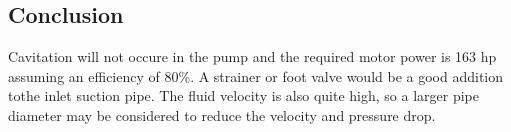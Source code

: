 \subsection{Conclusion}
Cavitation will not occure in the pump and the required motor power is 163 hp assuming an efficiency of 80\%. A strainer or foot valve would be a good addition tothe inlet suction pipe. The fluid velocity is also quite high, so a larger pipe diameter may be considered to reduce the velocity and pressure drop.

\